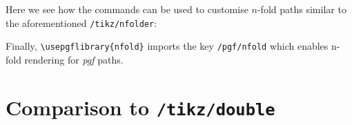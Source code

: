 \documentclass[12pt,a4paper]{article}
\theoremstyle{definition}
\newcommand{\tikzdouble}{\texttt{/tikz/double}}
\begin{document}
Here we see how the commands can be used to customise $n$-fold paths similar to the aforementioned \texttt{/tikz/nfolder}:
\begin{tkzexample}[latex=4cm]
\end{tkzexample}

Finally, \verb|\usepgflibrary{nfold}| imports the key \texttt{/pgf/nfold} which enables n-fold rendering for \textit{pgf} paths.

\section{Comparison to \tikzdouble}
\label{sec:doubleIssues}
\end{document}
